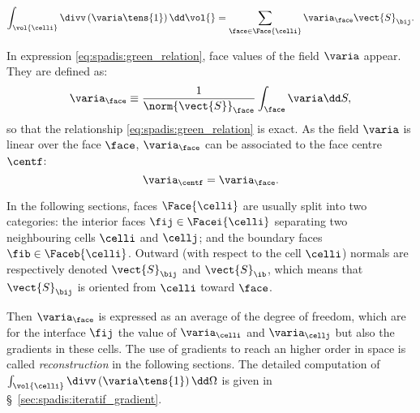 \begin{equation}\label{eq:spadis:green_relation}
\int_{\vol{\celli}} \divv \left( \varia \tens{1}\right) \dd \vol{} =  \sum\limits_{\face \in \Face{\celli}} \varia_{\face}\vect{S}_{\bij}.
\end{equation}

In expression \eqref{eq:spadis:green_relation}, face values of the field $\varia$ appear. They are defined as:
\begin{equation}\label{eq:spadis:variaf_def}
\varia_\face \equiv \dfrac{1}{\norm{\vect{S}}_\face} \int_{\face} \varia \dd S,
\end{equation}
%
so that the relationship \eqref{eq:spadis:green_relation} is exact. As the field $\varia$ is linear over the face $\face$,
$\varia_\face$ can be associated to the face centre $\centf$:
\begin{equation}\label{eq:spadis:variaf_id}
\varia_{\centf} = \varia_\face.
\end{equation}

In the following sections, faces $\Face{\celli}$ are usually split into two categories: the interior faces $\fij \in \Facei{\celli}$ separating
two neighbouring cells $\celli$ and $\cellj$; and the boundary faces $\fib \in \Faceb{\celli}$.
Outward (with respect to the cell $\celli$) normals are respectively denoted  $\vect{S}_{\bij}$ and $\vect{S}_\ib$,
which means that $\vect{S}_{\bij}$ is oriented from $\celli$ toward $\face$.

Then $\varia_{\face}$ is expressed as an average of the degree of freedom, which are for the interface $\fij$ the value of $\varia_{\celli}$
and $\varia_{\cellj}$ but also the gradients in these cells. The use of gradients to reach an higher order in space is called \emph{reconstruction}
in the following sections. The detailed computation of $\int_{\vol{\celli}} \divv \left( \varia \tens{1}\right) \dd \Omega $ is given in
 \S~\ref{sec:spadis:iteratif_gradient}.
%

